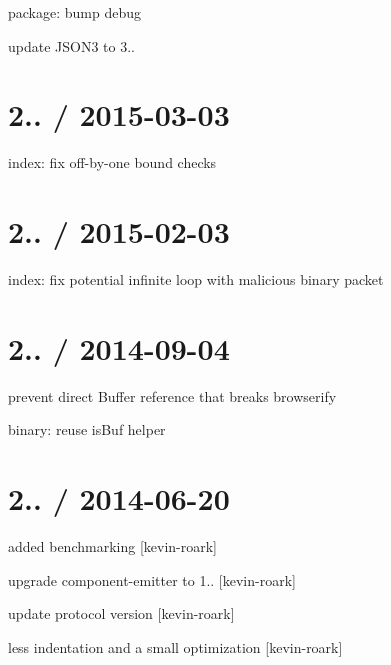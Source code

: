\begin{DoxyItemize}
\item package\+: bump debug
\item update J\+S\+O\+N3 to 3..
\end{DoxyItemize}

\section*{2.. / 2015-\/03-\/03 }


\begin{DoxyItemize}
\item index\+: fix off-\/by-\/one bound checks
\end{DoxyItemize}

\section*{2.. / 2015-\/02-\/03 }


\begin{DoxyItemize}
\item index\+: fix potential infinite loop with malicious binary packet
\end{DoxyItemize}

\section*{2.. / 2014-\/09-\/04 }


\begin{DoxyItemize}
\item prevent direct {\ttfamily Buffer} reference that breaks browserify
\item binary\+: reuse {\ttfamily is\+Buf} helper
\end{DoxyItemize}

\section*{2.. / 2014-\/06-\/20 }


\begin{DoxyItemize}
\item added benchmarking \mbox{[}kevin-\/roark\mbox{]}
\item upgrade component-\/emitter to 1.. \mbox{[}kevin-\/roark\mbox{]}
\item update protocol version \mbox{[}kevin-\/roark\mbox{]}
\item less indentation and a small optimization \mbox{[}kevin-\/roark\mbox{]}
\end{DoxyItemize}

